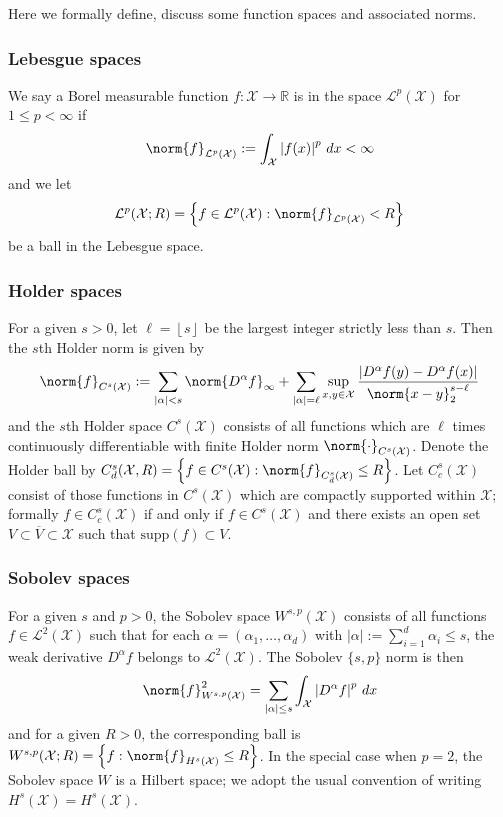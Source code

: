 \documentclass{article}
\newcommand{\Reals}{\mathbb{R}}
\newcommand{\abs}[1]{\left \lvert #1 \right \rvert}
\newcommand{\set}[1]{\left\{#1\right\}}
\newcommand{\floor}[1]{\left\lfloor #1 \right\rfloor}
\newcommand{\1}{\mathbf{1}}
\newcommand{\Xset}{\mathcal{X}}
\newcommand{\Leb}{\mathcal{L}}
\newcommand{\ol}[1]{\overline{#1}}
\theoremstyle{alden}
\theoremstyle{aldenthm}
\theoremstyle{definition}
\theoremstyle{remark}
\begin{document}
Here we formally define, discuss some function spaces and associated norms.

\subsubsection{Lebesgue spaces}

We say a Borel measurable function $f: \mathcal{X} \to \Reals$ is in the space $\mathcal{L}^p(\mathcal{X})$ for $1 \leq p < \infty$ if 
$$\norm{f}_{\mathcal{L}^p(\mathcal{X})} := \int_{\mathcal{X}} \abs{f(x)}^p \,dx < \infty$$
and we let 
\begin{equation*}
\mathcal{L}^p(\mathcal{X};R) = \set{f \in \mathcal{L}^p(\mathcal{X}): \norm{f}_{\mathcal{L}^p(\mathcal{X})} < R}
\end{equation*}
be a ball in the Lebesgue space.

\subsubsection{Holder spaces}

For a given $s > 0$, let $\ell = \floor{s}$ be the largest integer strictly less than $s$. Then the $s$th Holder norm is given by
\begin{equation*}
\norm{f}_{C^{s}(\mathcal{X})} := \sum_{\abs{\alpha} < s} \norm{D^{\alpha}f}_{\infty} + \sum_{\abs{\alpha} = \ell} \sup_{x,y \in \mathcal{X}} \frac{\abs{D^{\alpha}f(y) - D^{\alpha}f(x)}}{\norm{x - y}_2^{s - \ell}}
\end{equation*}
and the $s$th Holder space $C^{s}(\mathcal{X})$ consists of all functions which are $\ell$ times continuously differentiable with finite Holder norm $\norm{\cdot}_{C^{s}(\mathcal{X})}$. Denote the Holder ball by $C_d^{s}(\mathcal{X},R) = \set{f \in C^{s}(\mathcal{X}): \norm{f}_{C_d^{s}(\mathcal{X})} \leq R}$. Let $C_c^{s}(\Xset)$ consist of those functions in $C^s(\Xset)$ which are compactly supported within $\Xset$; formally $f \in C_c^{s}(\Xset)$ if and only if $f \in C^s(\Xset)$ and there exists an open set $V \subset \ol{V} \subset \Xset$ such that $\mathrm{supp}(f) \subset V$. 

\subsubsection{Sobolev spaces}

For a given $s$ and $p > 0$, the Sobolev space $W^{s,p}(\mathcal{X})$ consists of all functions $f \in \Leb^2(\mathcal{X})$ such that for each $\alpha = (\alpha_1,\ldots,\alpha_d)$ with $\abs{\alpha} := \sum_{i = 1}^{d} \alpha_i \leq s$, the weak derivative $D^{\alpha}f$ belongs to $\mathcal{L}^2(\mathcal{X})$. The Sobolev $\{s,p\}$ norm is then 
\begin{equation*}
\norm{f}_{W^{s,p}(\mathcal{X})}^2 = \sum_{\abs{\alpha} \leq s} \int_{\mathcal{X}} \abs{D^{\alpha}f}^p \,dx
\end{equation*}
and for a given $R > 0$, the corresponding ball is $W^{s,p}(\Xset; R) = \set{f: \norm{f}_{H^s(\Xset)} \leq R}$. In the special case when $p = 2$, the Sobolev space $W$ is a Hilbert space; we adopt the usual convention of writing $H^s(\Xset) = H^s(\Xset)$. 
\end{document}
